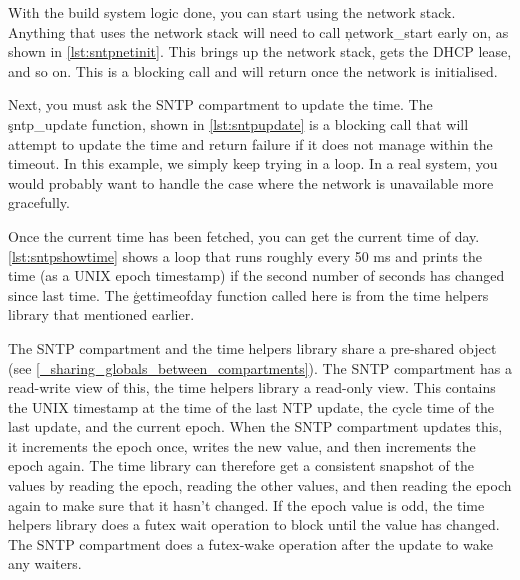 \lualisting[filename=examples/sntp/xmake.lua,marker=network_stack_threads,label=lst:xmakenetthreads,caption="Build system code for defining the network stack's threads."]{}

With the build system logic done, you can start using the network stack.
Anything that uses the network stack will need to call \c{network_start} early on, as shown in \ref{lst:sntpnetinit}.
This brings up the network stack, gets the DHCP lease, and so on.
This is a blocking call and will return once the network is initialised.

\codelisting[filename=examples/sntp/sntp.cc,marker=network_init,label=lst:sntpnetinit,caption="Initialisation for the network stack."]{}

Next, you must ask the SNTP compartment to update the time.
The \c{sntp_update} function, shown in \ref{lst:sntpupdate} is a blocking call that will attempt to update the time and return failure if it does not manage within the timeout.
In this example, we simply keep trying in a loop.
In a real system, you would probably want to handle the case where the network is unavailable more gracefully.

\codelisting[filename=examples/sntp/sntp.cc,marker=sntp_update,label=lst:sntpupdate,caption="Updating the time from the SNTP server."]{}

Once the current time has been fetched, you can get the current time of day.
\ref{lst:sntpshowtime} shows a loop that runs roughly every 50 ms and prints the time (as a UNIX epoch timestamp) if the second number of seconds has changed since last time.
The \c{gettimeofday} function called here is from the time helpers library that mentioned earlier.

\codelisting[filename=examples/sntp/sntp.cc,marker=show_time,label=lst:sntpshowtime,caption="Printing the current UNIX epoch time."]{}

The SNTP compartment and the time helpers library share a pre-shared object (see \ref{_sharing_globals_between_compartments}).
The SNTP compartment has a read-write view of this, the time helpers library a read-only view.
This contains the UNIX timestamp at the time of the last NTP update, the cycle time of the last update, and the current epoch.
When the SNTP compartment updates this, it increments the epoch once, writes the new value, and then increments the epoch again.
The time library can therefore get a consistent snapshot of the values by reading the epoch, reading the other values, and then reading the epoch again to make sure that it hasn't changed.
If the epoch value is odd, the time helpers library does a futex wait operation to block until the value has changed.
The SNTP compartment does a futex-wake operation after the update to wake any waiters.

